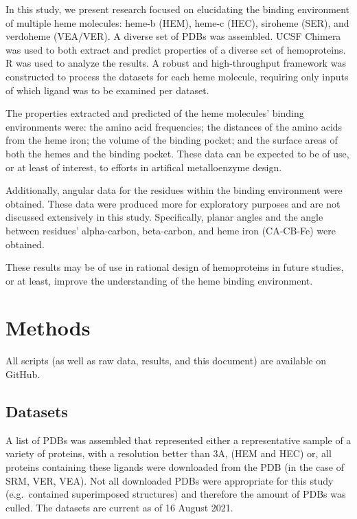 \documentclass[a4paper, nobind]{templates/ociamthesis}
\begin{document}
In this study, we present research focused on elucidating the binding environment of multiple heme molecules: heme-b (HEM), heme-c (HEC), siroheme (SER), and verdoheme (VEA/VER). A diverse set of PDBs was assembled. UCSF Chimera was used to both extract and predict properties of a diverse set of hemoproteins. R was used to analyze the results. A robust and high-throughput framework was constructed to process the datasets for each heme molecule, requiring only inputs of which ligand was to be examined per dataset.

The properties extracted and predicted of the heme molecules' binding environments were: the amino acid frequencies; the distances of the amino acids from the heme iron; the volume of the binding pocket; and the surface areas of both the hemes and the binding pocket. These data can be expected to be of use, or at least of interest, to efforts in artifical metalloenzyme design.

Additionally, angular data for the residues within the binding environment were obtained. These data were produced more for exploratory purposes and are not discussed extensively in this study. Specifically, planar angles and the angle between residues' alpha-carbon, beta-carbon, and heme iron (CA-CB-Fe) were obtained.

These results may be of use in rational design of hemoproteins in future studies, or at least, improve the understanding of the heme binding environment.

\adjustmtc
{}

\hypertarget{methods}{%
\chapter{Methods}\label{methods}}

All scripts (as well as raw data, results, and this document) are available on GitHub\autocite{Finnerty_hemebinding_2021}.

\hypertarget{datasets}{%
\section{Datasets}\label{datasets}}

\noindent A list of PDBs was assembled that represented either a representative sample of a variety of proteins, with a resolution better than 3A, (HEM and HEC) or, all proteins containing these ligands were downloaded from the PDB (in the case of SRM, VER, VEA). Not all downloaded PDBs were appropriate for this study (e.g.~contained superimposed structures) and therefore the amount of PDBs was culled. The datasets are current as of 16 August 2021.
\end{document}
